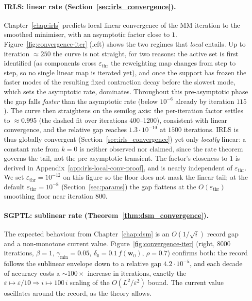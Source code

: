 \paragraph{IRLS: linear rate (Section~\ref{sec:irls_convergence}).}
Chapter~\ref{chap:irls} predicts local linear convergence of the MM
iteration to the smoothed minimiser, with an asymptotic factor close to
$1$. Figure~\ref{fig:convergence-iter} (left) shows the two regimes that
\emph{local} entails. Up to iteration $\approx 250$ the curve is not
straight, for two reasons: the active set is first identified (as
components cross $\varepsilon_\text{thr}$ the reweighting map changes from
step to step, so no single linear map is iterated yet), and once the
support has frozen the faster modes of the resulting fixed contraction
decay before the slowest mode, which sets the asymptotic rate, dominates.
Throughout this pre-asymptotic phase the gap falls \emph{faster} than the
asymptotic rate (below $10^{-6}$ already by iteration $115$). The curve
then straightens on the semilog axis: the per-iteration factor settles to
$\approx 0.995$ (the dashed fit over iterations $400$--$1200$),
consistent with linear convergence, and the relative gap reaches
$1.3\cdot 10^{-10}$ at $1500$ iterations. IRLS is thus globally convergent
(Section~\ref{sec:irls_convergence}) yet only \emph{locally} linear: a
constant rate from $k=0$ is neither observed nor claimed, since the rate
theorem governs the tail, not the pre-asymptotic transient. The factor's
closeness to $1$ is derived in Appendix~\ref{app:irls-local-conv-proof},
and is nearly independent of $\varepsilon_\text{thr}$. We set $\varepsilon_\text{thr}=10^{-12}$ on this
figure so the floor does not mask the linear tail; at the default
$\varepsilon_\text{thr}=10^{-8}$ (Section~\ref{sec:params}) the gap
flattens at the $O(\varepsilon_\text{thr})$ smoothing floor near iteration
$800$.

\paragraph{SGPTL: sublinear rate (Theorem~\ref{thm:dsm_convergence}).}
The expected behaviour from Chapter~\ref{chap:dsm} is an $O(1/\sqrt{i})$
record gap and a non-monotone current value. Figure~\ref{fig:convergence-iter} (right,
$8000$ iterations, $\beta=1$, $\gamma_{\min}=0.05$,
$\delta_{0}=0.1\,f(\mathbf{w}_{0})$, $\rho=0.7$) confirms both: the
record follows the sublinear envelope down to a relative gap
$4.2\cdot 10^{-5}$, and each decade of accuracy costs a $\sim\!100\times$
increase in iterations, exactly the $\varepsilon\mapsto\varepsilon/10
\Rightarrow i\mapsto 100\,i$ scaling of the $O(L^{2}/\varepsilon^{2})$
bound. The current value oscillates around the record, as the theory
allows.

